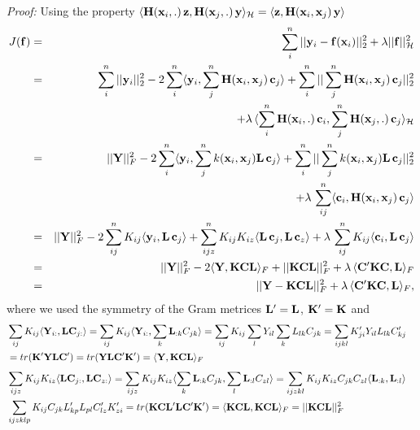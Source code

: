 \begin{small}
\emph{Proof:} Using the property
$\langle \mathbf{H}(\mathbf{x}_i,.) \, \mathbf{z}, \mathbf{H}(\mathbf{x}_j,.) \, \mathbf{y} \rangle_\mathcal{H}
= \langle \mathbf{z}, \mathbf{H}(\mathbf{x}_i,\mathbf{x}_j) \, \mathbf{y} \rangle$ 
\begin{eqnarray*}
J(\mathbf{f}) & = & \sum_i^n || \mathbf{y}_i - \mathbf{f}(\mathbf{x}_i) ||_2^2 + \lambda
||\mathbf{f}||_\mathcal{H}^2 \nonumber \\
& = &
\sum_i^n || \mathbf{y}_i ||_2^2
- 2 \sum_i^n \langle \mathbf{y}_i , \sum_j^n \mathbf{H}(\mathbf{x}_i,
\mathbf{x}_j) \, \mathbf{c}_j \rangle
+ \sum_i^n || \sum_j^n \mathbf{H}(\mathbf{x}_i,
\mathbf{x}_j) \, \mathbf{c}_j ||_2^2 \\
& & + \lambda \, \langle \sum_i^n \mathbf{H}(\mathbf{x}_i,
.) \, \mathbf{c}_i , \sum_j^n \mathbf{H}(\mathbf{x}_j,
.) \, \mathbf{c}_j \rangle_\mathcal{H} \\
& = &
|| \mathbf{Y} ||_F^2
- 2 \sum_i^n \langle \mathbf{y}_i , \sum_j^n k(\mathbf{x}_i,
\mathbf{x}_j) \mathbf{L} \, \mathbf{c}_j \rangle
+ \sum_i^n || \sum_j^n k(\mathbf{x}_i,
\mathbf{x}_j)\mathbf{L} \, \mathbf{c}_j ||_2^2 \\
& & + \lambda \, \sum_{ij}^n \langle \mathbf{c}_i , \mathbf{H}(\mathbf{x}_i,
\mathbf{x}_j) \, \mathbf{c}_j \rangle \\
& = &
|| \mathbf{Y} ||_F^2
- 2 \sum_{ij}^n K_{ij} \langle \mathbf{y}_i , \mathbf{L} \, \mathbf{c}_j \rangle
+ \sum_{ijz}^n K_{ij} K_{iz} \langle \mathbf{L} \, \mathbf{c}_j, \mathbf{L} \, \mathbf{c}_z \rangle
+ \lambda \, \sum_{ij}^n K_{ij} \langle \mathbf{c}_i , \mathbf{L} \, \mathbf{c}_j \rangle \\
& = &
|| \mathbf{Y} ||_F^2
- 2 \langle \mathbf{Y},\mathbf{KCL} \rangle_F
+ || \mathbf{KCL} ||_F^2
+ \lambda \, \langle \mathbf{C'KC},\mathbf{L} \rangle_F \\
& = &
|| \mathbf{Y} - \mathbf{KCL} ||_F^2
+ \lambda \, \langle \mathbf{C'KC},\mathbf{L} \rangle_F,
\end{eqnarray*}
where we used the symmetry of the Gram metrices $\mathbf{L'}=\mathbf{L}$, $\mathbf{K'}=\mathbf{K}$ and
\begin{eqnarray*}
& \sum_{ij} K_{ij} \langle \mathbf{Y}_{i:}, \mathbf{L} \mathbf{C}_{j:} \rangle = 
 \sum_{ij} K_{ij} \langle \mathbf{Y}_{i:}, \sum_k \mathbf{L}_{:k} C_{jk} \rangle =
 \sum_{ij} K_{ij} \sum_l Y_{il} \sum_k L_{lk} C_{jk} = 
 \sum_{ijkl} K'_{ji} Y_{il} L_{lk} C'_{kj} & \\
& = tr(\mathbf{K'YLC'}) =
 tr(\mathbf{YLC'K'}) =
 \langle \mathbf{Y}, \mathbf{KCL} \rangle_F &
\end{eqnarray*}
\begin{eqnarray*}
& \sum_{ijz} K_{ij} K_{iz} \langle \mathbf{L} \mathbf{C}_{j:}, \mathbf{L} \mathbf{C}_{z:} \rangle = 
 \sum_{ijz} K_{ij} K_{iz} \langle \sum_k \mathbf{L}_{:k} C_{jk}, \sum_l \mathbf{L}_{:l} C_{zl} \rangle =
 \sum_{ijzkl} K_{ij} K_{iz}  C_{jk} C_{zl} \langle \mathbf{L}_{:k}, \mathbf{L}_{:l}  \rangle \\
& \sum_{ijzklp} K_{ij} C_{jk} L'_{kp} L_{pl} C'_{lz} K'_{zi} 
 = tr(\mathbf{KCL'LC'K'}) =
 \langle \mathbf{KCL}, \mathbf{KCL} \rangle_F  = ||\mathbf{KCL}||_F^2 &
\end{eqnarray*}
\end{small}


